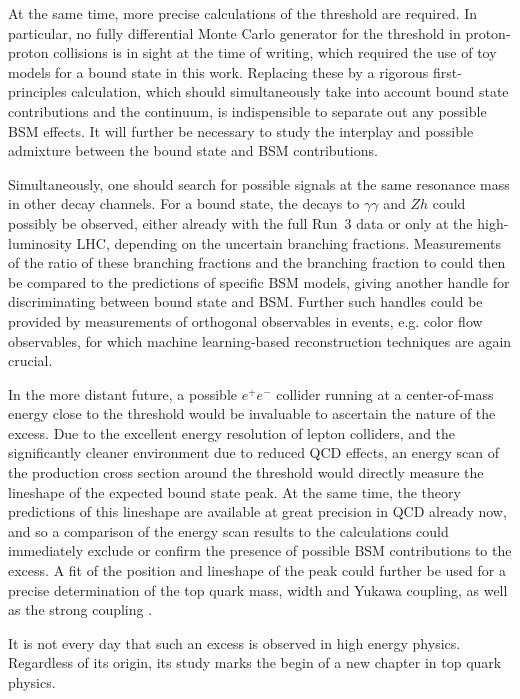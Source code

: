 At the same time, more precise calculations of the \ttbar threshold are required. In particular, no fully differential Monte Carlo generator for the \ttbar threshold in proton-proton collisions is in sight at the time of writing, which required the use of toy models for a \ttbar bound state in this work. Replacing these by a rigorous first-principles calculation, which should simultaneously take into account bound state contributions and the \ttbar continuum, is indispensible to separate out any possible BSM effects. It will further be necessary to study the interplay and possible admixture between the bound state and BSM contributions.

Simultaneously, one should search for possible signals at the same resonance mass in other decay channels. For a \ttbar bound state, the decays to $\gamma\gamma$ and $Zh$ could possibly be observed, either already with the full Run~3 data or only at the high-luminosity LHC, depending on the uncertain branching fractions. Measurements of the ratio of these branching fractions and the branching fraction to \ttbar could then be compared to the predictions of specific BSM models, giving another handle for discriminating between \ttbar bound state and BSM. Further such handles could be provided by measurements of orthogonal observables in \ttbar events, e.g. color flow observables, for which machine learning-based reconstruction techniques are again crucial.

In the more distant future, a possible $e^+e^-$ collider running at a center-of-mass energy close to the \ttbar threshold would be invaluable to ascertain the nature of the excess. Due to the excellent energy resolution of lepton colliders, and the significantly cleaner environment due to reduced QCD effects, an energy scan of the \ttbar production cross section around the threshold would directly measure the lineshape of the expected bound state peak. At the same time, the theory predictions of this lineshape are available at great precision in QCD already now, and so a comparison of the energy scan results to the calculations could immediately exclude or confirm the presence of possible BSM contributions to the excess. A fit of the position and lineshape of the peak could further be used for a precise determination of the top quark mass, width and Yukawa coupling, as well as the strong coupling \alphas.


\smallskip

It is not every day that such an excess is observed in high energy physics. Regardless of its origin, its study marks the begin of a new chapter in top quark physics.


